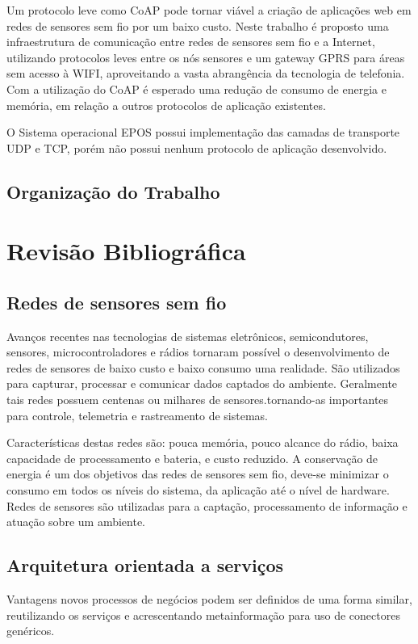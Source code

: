 Um protocolo leve como CoAP pode tornar viável a criação de aplicações web em redes de sensores sem fio por um baixo custo. Neste trabalho é proposto uma infraestrutura de comunicação entre redes de sensores sem fio e a Internet, utilizando protocolos leves entre os nós sensores e um gateway GPRS para áreas sem acesso à WIFI, aproveitando a vasta abrangência da tecnologia de telefonia. Com a utilização do CoAP é esperado uma redução de consumo de energia e memória, em relação a outros protocolos de aplicação existentes.

O Sistema operacional EPOS possui implementação das camadas de transporte UDP e TCP, porém não possui nenhum protocolo de aplicação desenvolvido.

\subsection{Organização do Trabalho}

\section{Revisão Bibliográfica}

\subsection{Redes de sensores sem fio}
Avanços recentes nas tecnologias de sistemas eletrônicos, semicondutores, sensores, microcontroladores e rádios tornaram possível o desenvolvimento de redes de sensores de baixo custo e baixo consumo uma realidade. São utilizados para capturar, processar e comunicar dados captados do ambiente. Geralmente tais redes possuem centenas ou milhares de sensores.tornando-as importantes para controle, telemetria e rastreamento de sistemas.

Características destas redes são: pouca memória, pouco alcance do rádio, baixa capacidade de processamento e bateria, e custo reduzido. A conservação de energia é um dos objetivos das redes de sensores sem fio, deve-se minimizar o consumo em todos os níveis do sistema, da aplicação até o nível de hardware. Redes de sensores são utilizadas para a captação, processamento de informação e atuação sobre um ambiente.

\subsection{Arquitetura orientada a serviços}
Vantagens novos processos de negócios podem ser definidos de uma forma similar, 
reutilizando os serviços e acrescentando metainformação para
uso de conectores genéricos.
\cite{perrey2003service}

